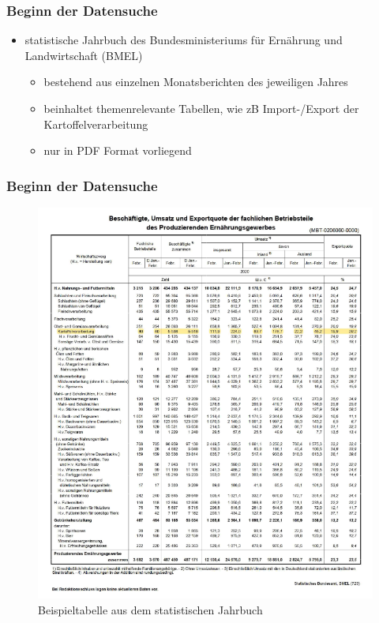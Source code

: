 \documentclass{beamer}
\begin{document}
\begin{frame}
	\frametitle{Beginn der Datensuche}
		\begin{itemize}
			\item statistische Jahrbuch des Bundesministeriums für Ernährung und Landwirtschaft (BMEL)
			\begin{itemize}
				\item bestehend aus einzelnen Monatsberichten des jeweiligen Jahres
				\item beinhaltet themenrelevante Tabellen, wie zB Import-/Export der Kartoffelverarbeitung
				\item nur in PDF Format vorliegend
			\end{itemize}
		\end{itemize}	
\end{frame}

\begin{frame}
	\frametitle{Beginn der Datensuche}
	\begin{figure}[h]
	\caption{Beispieltabelle aus dem statistischen Jahrbuch}
	\centering
	\includegraphics[scale=0.5]{3_Beispieltabelle}
	\end{figure}
\end{frame}
\end{document}
